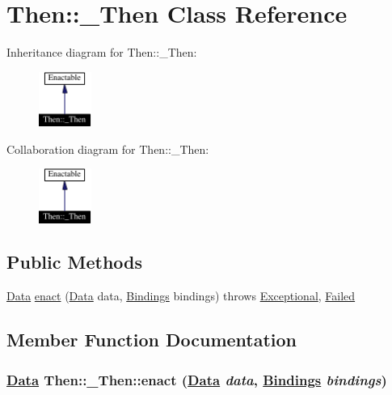 \hypertarget{classThen_1_1__Then}{
\section{Then::\_\-Then  Class Reference}
\label{classThen_1_1__Then}
}
Inheritance diagram for Then::\_\-Then:\begin{figure}[H]
\begin{center}
\leavevmode
\includegraphics[width=49pt]{classThen_1_1__Then__inherit__graph}
\end{center}
\end{figure}
Collaboration diagram for Then::\_\-Then:\begin{figure}[H]
\begin{center}
\leavevmode
\includegraphics[width=49pt]{classThen_1_1__Then__coll__graph}
\end{center}
\end{figure}
\subsection*{Public Methods}
\begin{CompactItemize}
\item 
\hyperlink{interfaceData}{Data} \hyperlink{classThen_1_1__Then_a0}{enact} (\hyperlink{interfaceData}{Data} data, \hyperlink{interfaceBindings}{Bindings} bindings) throws \hyperlink{classExceptional}{Exceptional}, \hyperlink{classFailed}{Failed}
\end{CompactItemize}


\subsection{Member Function Documentation}
\hypertarget{classThen_1_1__Then_a0}{
\subsubsection[enact]{\setlength{\rightskip}{0pt plus 5cm}\hyperlink{interfaceData}{Data} Then::\_\-Then::enact (\hyperlink{interfaceData}{Data} {\em data}, \hyperlink{interfaceBindings}{Bindings} {\em bindings})}}
\label{classThen_1_1__Then_a0}




